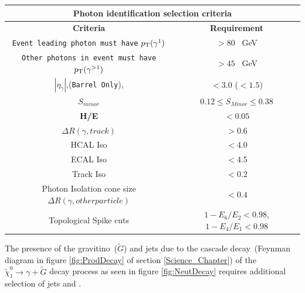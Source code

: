 \begin{center}
\centering
\begin{tabular}{c c }
\multicolumn{2}{c}{\bfseries{Photon identification selection criteria}} \\
  \hline 
  \bfseries{Criteria} & \bfseries{Requirement} \\
   \hline 
  \texttt{Event leading photon must have} $p_{\mathrm{T}}(\gamma^{1})$  & $ > 80$~ GeV \\
  \texttt{Other photons in event must have} $p_{\mathrm{T}}(\gamma^{>1})$  & $ > 45$~ GeV \\
  
 $|\eta_{\gamma}|$,(\texttt{Barrel Only}),  & $ < 3.0$ ($ < 1.5$) \\
 $S_{minor}$  & $ 0.12 \leq S_{Minor} \leq 0.38$ \\
 \textbf{H/E}  & $ < 0.05$ \\
 
 $\Delta R(\gamma, track)$  & $ > 0.6 $ \\
 
 HCAL Iso  & $ < 4.0 $ \\
 ECAL Iso   & $ < 4.5 $ \\
 Track Iso   & $ < 0.2 $ \\
 Photon Isolation cone size $\Delta R(\gamma, other particle)$ & $< 0.4$ \\
 Topological Spike cuts  & $1 - E_{6}/E_{2} < 0.98$, $ 1 - E_{4}/E_{1} < 0.98$ \\ 
  \hline 
\end{tabular}
\label{tab:PhotonSel}
\end{center}

The presence of the gravitino~($\tilde{G}$) and jets due to the cascade decay~(Feynman diagram in figure \ref{fig:ProdDecay} of section \ref{Science_Chapter}) of the $\tilde{\chi}^{0}_{1} \rightarrow \gamma + \tilde{G}$ decay process as seen in figure \ref{fig:NeutDecay} requires additional selection of jets and \MET.

